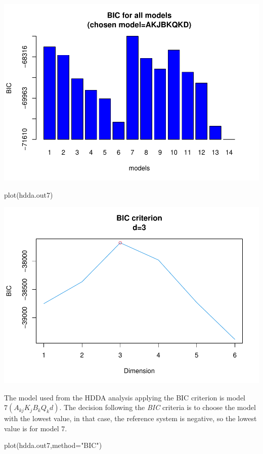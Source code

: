 \documentclass[
  11pt,
]{article}
\newenvironment{Shaded}{\begin{snugshade}}{\end{snugshade}}
\newcommand{\AttributeTok}[1]{\textcolor[rgb]{0.77,0.63,0.00}{#1}}
\newcommand{\FunctionTok}[1]{\textcolor[rgb]{0.00,0.00,0.00}{#1}}
\newcommand{\NormalTok}[1]{#1}
\newcommand{\StringTok}[1]{\textcolor[rgb]{0.31,0.60,0.02}{#1}}
\begin{document}
\includegraphics{1_Task_files/figure-latex/Task_1_11-1.pdf}

\begin{Shaded}
\begin{Highlighting}[]
\FunctionTok{plot}\NormalTok{(hdda.out7)}
\end{Highlighting}
\end{Shaded}

\includegraphics{1_Task_files/figure-latex/Task_1_11-2.pdf}

The model used from the HDDA analysis applying the BIC criterion is model \(7(A_{kj} K_{j} B_{k} Q_{k} d)\). The decision following the \emph{BIC} criteria is to choose the model with the lowest value, in that case, the reference system is negative, so the lowest value is for model \(7\).

\begin{Shaded}
\begin{Highlighting}[]
\FunctionTok{plot}\NormalTok{(hdda.out7,}\AttributeTok{method=}\StringTok{"BIC"}\NormalTok{)}
\end{Highlighting}
\end{Shaded}
\end{document}
